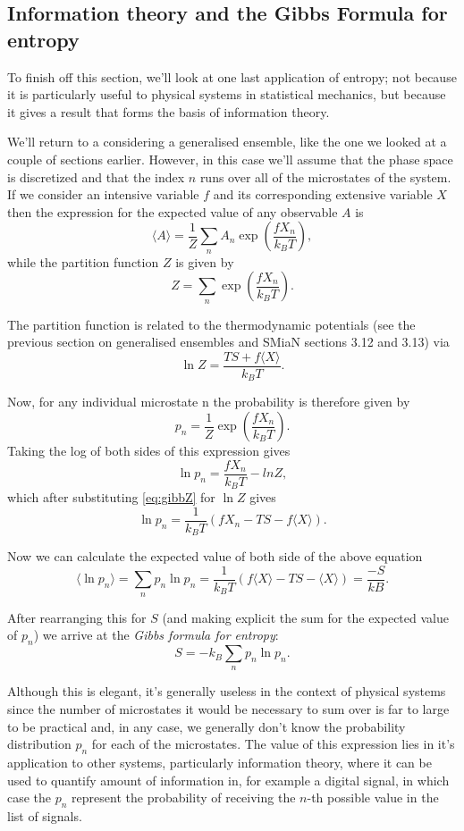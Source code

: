 \documentclass{article}
\begin{document}
\subsection*{Information theory and the Gibbs Formula for entropy}
To finish off this section, we'll look at one last application of entropy; not because it is particularly useful to physical systems in statistical mechanics, but because it gives a result that forms the basis of information theory.

We'll return to a considering a generalised ensemble, like the one we looked at a couple of sections earlier. However, in this case we'll assume that the phase space is discretized and that the index $n$ runs over all of the microstates of the system. If we consider an intensive variable $f$ and its corresponding extensive variable $X$ then the expression for the expected value of any observable $A$ is
$$
	\langle A \rangle = \frac{1}{Z}\sum_n A_n\exp\left(\frac{fX_n}{k_BT}\right),
$$
while the partition function $Z$ is given by
$$
	Z =\sum_n\exp\left(\frac{fX_n}{k_BT}\right).
$$

The partition function is related to the thermodynamic potentials (see the previous section on generalised ensembles and SMiaN sections 3.12 and 3.13) via
\begin{equation}
	\ln Z = \frac{TS+f\langle X\rangle}{k_BT}.
	\label{eq:gibbZ}
\end{equation}

Now, for any individual microstate n the probability is therefore given by
$$
	p_n = \frac{1}{Z}\exp\left(\frac{fX_n}{k_BT}\right).
$$
Taking the log of both sides of this expression gives
$$
	\ln p_n = \frac{fX_n}{k_BT} - ln Z,
$$
which after substituting \ref{eq:gibbZ} for $\ln Z$ gives
$$
	\ln p_n = \frac{1}{k_BT}(fX_n -TS -f\langle X\rangle).
$$

Now we can calculate the expected value of both side of the above equation
$$
	\langle \ln p_n \rangle = \sum_n p_n\ln p_n = \frac{1}{k_BT}(f\langle X\rangle -TS -\langle X \rangle) = \frac{-S}{kB}.
$$

After rearranging this for $S$ (and making explicit the sum for the expected value of $p_n$) we arrive at the \emph{Gibbs formula for entropy}:
$$
	S = -k_B\sum_np_n\ln p_n.
$$

Although this is elegant, it's generally useless in the context of physical systems since the number of microstates it would be necessary to sum over is far to large to be practical and, in any case, we generally don't know the probability distribution $p_n$ for each of the microstates. The value of this expression lies in it's application to other systems, particularly information theory, where it can be used to quantify amount of information in, for example a digital signal, in which case the $p_n$ represent the probability of receiving the $n$-th possible value in the list of signals.
\end{document}
